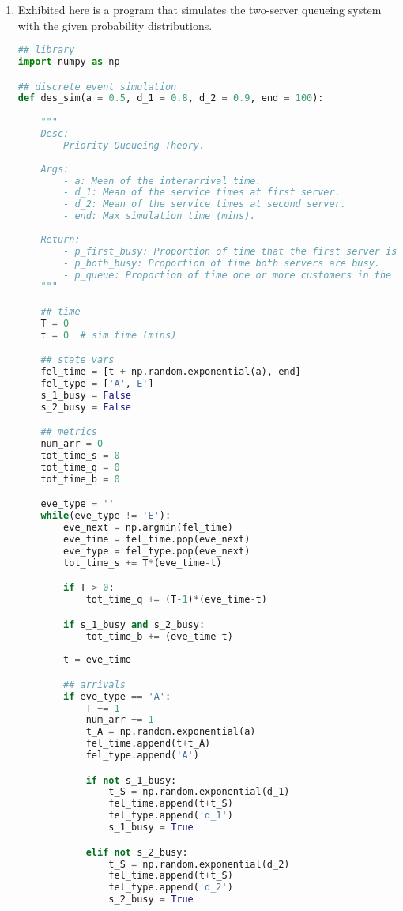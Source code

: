 \documentclass{article}
\begin{document}
\begin{enumerate}
\begin{enumerate}
    \item Exhibited here is a program that simulates the two-server queueing system with the given probability distributions.

\begin{lstlisting}[language=Python, title=Fig. Python 1(d)]
## library
import numpy as np

## discrete event simulation 
def des_sim(a = 0.5, d_1 = 0.8, d_2 = 0.9, end = 100):
    
    """
    Desc:
        Priority Queueing Theory.
    
    Args:
        - a: Mean of the interarrival time.
        - d_1: Mean of the service times at first server.
        - d_2: Mean of the service times at second server.
        - end: Max simulation time (mins).
    
    Return:
        - p_first_busy: Proportion of time that the first server is busy.
        - p_both_busy: Proportion of time both servers are busy.
        - p_queue: Proportion of time one or more customers in the queue.
    """

    ## time
    T = 0
    t = 0  # sim time (mins)

    ## state vars
    fel_time = [t + np.random.exponential(a), end]
    fel_type = ['A','E']
    s_1_busy = False
    s_2_busy = False

    ## metrics 
    num_arr = 0 
    tot_time_s = 0 
    tot_time_q = 0 
    tot_time_b = 0

    eve_type = ''
    while(eve_type != 'E'):
        eve_next = np.argmin(fel_time)
        eve_time = fel_time.pop(eve_next)
        eve_type = fel_type.pop(eve_next)
        tot_time_s += T*(eve_time-t)

        if T > 0:
            tot_time_q += (T-1)*(eve_time-t)

        if s_1_busy and s_2_busy:
            tot_time_b += (eve_time-t)
            
        t = eve_time

        ## arrivals
        if eve_type == 'A':
            T += 1 
            num_arr += 1
            t_A = np.random.exponential(a)
            fel_time.append(t+t_A)
            fel_type.append('A')

            if not s_1_busy:
                t_S = np.random.exponential(d_1)
                fel_time.append(t+t_S)
                fel_type.append('d_1')
                s_1_busy = True

            elif not s_2_busy:
                t_S = np.random.exponential(d_2)
                fel_time.append(t+t_S)
                fel_type.append('d_2')
                s_2_busy = True


\end{lstlisting}
\end{enumerate}
\end{enumerate}
\end{document}
